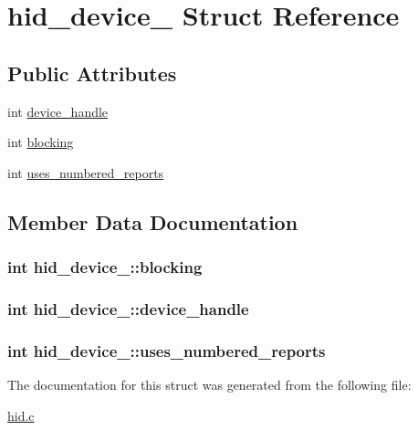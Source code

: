 \hypertarget{structhid__device__}{\section{hid\-\_\-device\-\_\- \-Struct \-Reference}
\label{structhid__device__}
}
\subsection*{\-Public \-Attributes}
\begin{DoxyCompactItemize}
\item 
int \hyperlink{structhid__device___acbcc48ecdd887f36390da3bb05a6d5d5}{device\-\_\-handle}
\item 
int \hyperlink{structhid__device___ae4a8b40297f31863df3133637cfa2121}{blocking}
\item 
int \hyperlink{structhid__device___a58ed6252074ed422235fe9e0c48aeafe}{uses\-\_\-numbered\-\_\-reports}
\end{DoxyCompactItemize}


\subsection{\-Member \-Data \-Documentation}
\hypertarget{structhid__device___ae4a8b40297f31863df3133637cfa2121}{
\subsubsection[{blocking}]{\setlength{\rightskip}{0pt plus 5cm}int {\bf hid\-\_\-device\-\_\-\-::blocking}}}\label{structhid__device___ae4a8b40297f31863df3133637cfa2121}
\hypertarget{structhid__device___acbcc48ecdd887f36390da3bb05a6d5d5}{
\subsubsection[{device\-\_\-handle}]{\setlength{\rightskip}{0pt plus 5cm}int {\bf hid\-\_\-device\-\_\-\-::device\-\_\-handle}}}\label{structhid__device___acbcc48ecdd887f36390da3bb05a6d5d5}
\hypertarget{structhid__device___a58ed6252074ed422235fe9e0c48aeafe}{
\subsubsection[{uses\-\_\-numbered\-\_\-reports}]{\setlength{\rightskip}{0pt plus 5cm}int {\bf hid\-\_\-device\-\_\-\-::uses\-\_\-numbered\-\_\-reports}}}\label{structhid__device___a58ed6252074ed422235fe9e0c48aeafe}


\-The documentation for this struct was generated from the following file\-:\begin{DoxyCompactItemize}
\item 
\hyperlink{hid_8c}{hid.\-c}\end{DoxyCompactItemize}

